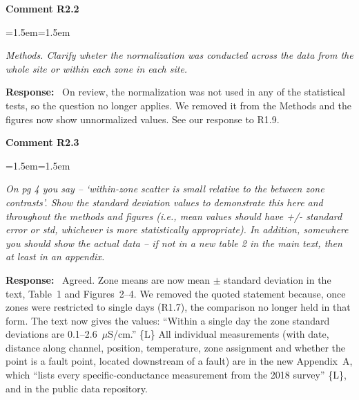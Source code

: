 \documentclass[11pt]{article}
\newenvironment{comment}[1]
  {\par\medskip\noindent\textbf{Comment #1}\par
   \begin{list}{}{\leftmargin=1.5em\rightmargin=1.5em}\item\color{commentcolor}\itshape}
  {\end{list}}
\newenvironment{response}
  {\par\noindent\textbf{Response:}\ }
  {\par}
\newcommand{\Ln}[1]{\{L\Lref{L:#1}\}}
\newcommand{\mq}[1]{``#1''}
\begin{document}
\begin{comment}{R2.2}
Methods. Clarify wheter the normalization was conducted across the data from the whole
site or within each zone in each site.
\end{comment}
\begin{response}
On review, the normalization was not used in any of the statistical tests, so the question no
longer applies. We removed it from the Methods and the figures now show unnormalized values.
See our response to R1.9.
\end{response}

\begin{comment}{R2.3}
On pg 4 you say -- `within-zone scatter is small relative to the between zone contrasts'.
Show the standard deviation values to demonstrate this here and throughout the methods and
figures (i.e., mean values should have +/- standard error or std, whichever is more
statistically appropriate). In addition, somewhere you should show the actual data -- if
not in a new table 2 in the main text, then at least in an appendix.
\end{comment}
\begin{response}
Agreed. Zone means are now mean $\pm$ standard deviation in the text, Table~1 and
Figures~2--4. We removed the quoted statement because, once zones were restricted to
single days (R1.7), the comparison no longer held in that form. The text now gives the values: \mq{Within a single day the zone standard deviations are
0.1--2.6~$\mu$S/cm.} \Ln{sd-range} All individual measurements (with date, distance along channel, position, temperature,
zone assignment and whether the point is a fault point, located downstream of a fault) are in the new Appendix~A, which \mq{lists every
specific-conductance measurement from the 2018 survey} \Ln{appendix}, and in the public data
repository.
\end{response}
\end{document}
